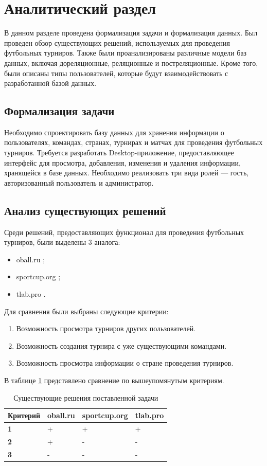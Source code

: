 \section{Аналитический раздел}
В данном разделе проведена формализация задачи и формализация данных. Был проведен обзор существующих решений, используемых для проведения футбольных турниров. Также были проанализированы различные модели баз данных, включая дореляционные, реляционные и постреляционные. Кроме того, были описаны типы пользователей, которые будут взаимодействовать с разработанной базой данных.
\subsection{Формализация задачи}
Необходимо спроектировать базу данных для хранения информации о пользователях, командах, странах, турнирах и матчах для проведения футбольных турниров. Требуется разработать Desktop-приложение, предоставляющее интерфейс для просмотра, добавления, изменения и удаления информации, хранящейся в базе данных. Необходимо реализовать три вида ролей --- гость, авторизованный пользователь и администратор.

\subsection{Анализ существующих решений}
Среди решений, предоставляющих функционал для проведения футбольных турниров, были выделены 3 аналога:
\begin{itemize}
    \item oball.ru \cite{oball};
    \item sportcup.org \cite{sportcup};
    \item tlab.pro \cite{tlab}.
\end{itemize}

Для сравнения были выбраны следующие критерии:
\begin{enumerate}
    \item Возможность просмотра турниров других пользователей.
    \item Возможность создания турнира с уже существующими командами.
    \item Возможность просмотра информации о стране проведения турниров.
\end{enumerate}

В таблице \ref{decisions} представлено сравнение по вышеупомянутым критериям.

\begin{table}[ht!]
	\centering
	\caption{Существующие решения поставленной задачи}
	\label{decisions}
	\begin{tabular}{|p{2.6cm}|p{3cm}|p{3cm}|p{3cm}|}
			\hline
			\textbf{Критерий} & \textbf{oball.ru} & \textbf{sportcup.org} & \textbf{tlab.pro}\\
			\hline
			\textbf{1} & + & + & +\\
			\hline
			\textbf{2} & + & - & -\\
			\hline
			\textbf{3} & - & -& -\\
			\hline
	\end{tabular}
\end{table}

